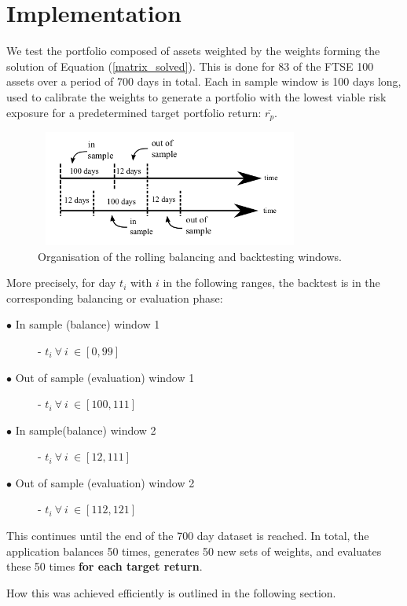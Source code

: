 \documentclass{article}
\begin{document}
\section{Implementation}
\label{sec:implementation}



We test the portfolio composed of assets weighted by the weights forming the solution of Equation (\ref{matrix_solved}). This is done for 83 of the FTSE 100 assets over a period of 700 days in total. Each in sample window is 100 days long, used to calibrate the weights to generate a portfolio with the lowest viable risk exposure for a predetermined target portfolio return: $\overline{r_p}$. 


\begin{figure}[H]
	\centerline{\includegraphics[width=3.5in,height=1.5in]{figures/backtesting_windows.png}}
	\label{backtetsing_window}
	\caption{Organisation of the rolling balancing and backtesting windows. \cite{notes}}
\end{figure}

More precisely, for day $t_i$ with $i$ in the following ranges, the backtest is in the corresponding balancing or evaluation phase:  

\begin{description}
	\item [$\bullet$ In sample (balance) window 1] - $t_i\:\forall\:i\:\in [0,99]$
	\item [$\bullet$ Out of sample (evaluation) window 1] - $t_i\:\forall\:i\:\in [100,111]$
	\item [$\bullet$ In sample(balance) window 2] - $t_i\:\forall\:i\:\in [12, 111]$
	\item [$\bullet$ Out of sample (evaluation) window 2] - $t_i\:\forall\:i\:\in [112, 121]$
\end{description}

This continues until the end of the 700 day dataset is reached. In total, the application balances 50 times, generates 50 new sets of weights, and evaluates these 50 times \textbf{for each target return}.

How this was achieved efficiently is outlined in the following section.
\end{document}
